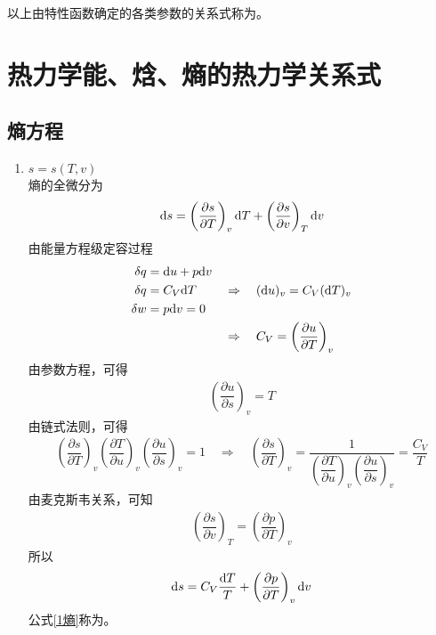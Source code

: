 以上由特性函数确定的各类参数的关系式称为。

\section{热力学能、焓、熵的热力学关系式}

\subsection{熵方程}
\begin{enumerate}[1.]
	\item $s = s(T,v)$
	\\熵的全微分为
	\begin{align}
		{\rm{d}} s = \left(\dfrac{\partial s}{\partial T}\right)_v {\rm{d}} T + \left(\dfrac{\partial s}{\partial v}\right)_T {\rm{d}} v
	\end{align}
	由能量方程级定容过程
	\begin{align}
		\begin{aligned}
			\delta q &= {\rm{d}} u + p {\rm{d}} v \\
			\delta q &= C_V {\rm{d}} T\\
			\delta w &= p {\rm{d}} v = 0
		\end{aligned}
		\quad &\Rightarrow \quad 
		({\rm{d}} u)_v = C_V ({\rm{d}} T)_v \notag\\
		&\Rightarrow \quad 
		C_V = \left(\dfrac{\partial u}{\partial T}\right)_v 
	\end{align}
	由参数方程，可得
	\begin{align*}
		\left(\dfrac{\partial u}{\partial s}\right)_v = T
	\end{align*}
	由链式法则，可得
	\begin{align}
		\left(\dfrac{\partial s}{\partial T}\right)_v \left(\dfrac{\partial T}{\partial u}\right)_v \left(\dfrac{\partial u}{\partial s}\right)_v = 1 \quad \Rightarrow \quad \left(\dfrac{\partial s}{\partial T}\right)_v  = \dfrac{1}{\displaystyle \left(\dfrac{\partial T}{\partial u}\right)_v \left(\dfrac{\partial u}{\partial s}\right)_v } = \dfrac{C_V}{T}
	\end{align}
	由麦克斯韦关系，可知
	\begin{align*}
		\left(\dfrac{\partial s}{\partial v}\right)_T = \left(\dfrac{\partial p}{\partial T}\right)_v
	\end{align*}
	所以
	\begin{align}
		{\rm{d}} s = C_V \dfrac{{\rm{d}} T}{T} + \left(\dfrac{\partial p}{\partial T}\right)_v {\rm{d}} v
		\label{1熵}
	\end{align}
	公式\eqref{1熵}称为。
	

\end{enumerate}
